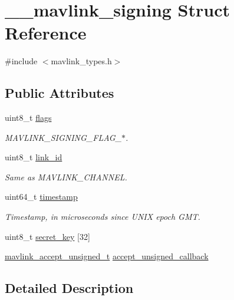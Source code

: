 \hypertarget{struct____mavlink__signing}{}\section{\+\_\+\+\_\+mavlink\+\_\+signing Struct Reference}
\label{struct____mavlink__signing}


{\ttfamily \#include $<$mavlink\+\_\+types.\+h$>$}

\subsection*{Public Attributes}
\begin{DoxyCompactItemize}
\item 
uint8\+\_\+t \mbox{\hyperlink{struct____mavlink__signing_a5e08957249da64329f7ee29c1c503516}{flags}}
\begin{DoxyCompactList}\small\item\em M\+A\+V\+L\+I\+N\+K\+\_\+\+S\+I\+G\+N\+I\+N\+G\+\_\+\+F\+L\+A\+G\+\_\+$\ast$. \end{DoxyCompactList}\item 
uint8\+\_\+t \mbox{\hyperlink{struct____mavlink__signing_a03d44bb3079f7af6924d6868846ccc57}{link\+\_\+id}}
\begin{DoxyCompactList}\small\item\em Same as M\+A\+V\+L\+I\+N\+K\+\_\+\+C\+H\+A\+N\+N\+EL. \end{DoxyCompactList}\item 
uint64\+\_\+t \mbox{\hyperlink{struct____mavlink__signing_ac6010de27e406777d336935ba93ddac1}{timestamp}}
\begin{DoxyCompactList}\small\item\em Timestamp, in microseconds since U\+N\+IX epoch G\+MT. \end{DoxyCompactList}\item 
uint8\+\_\+t \mbox{\hyperlink{struct____mavlink__signing_ade31cece3d550b1bf2e41c9c38b9964f}{secret\+\_\+key}} \mbox{[}32\mbox{]}
\item 
\mbox{\hyperlink{include__v2_80_2mavlink__types_8h_ae34bd7a529f7175ab3dcfab0ba5b0c0d}{mavlink\+\_\+accept\+\_\+unsigned\+\_\+t}} \mbox{\hyperlink{struct____mavlink__signing_a74f675ae2e09c5a793c06d5005cd7d1b}{accept\+\_\+unsigned\+\_\+callback}}
\end{DoxyCompactItemize}


\subsection{Detailed Description}


